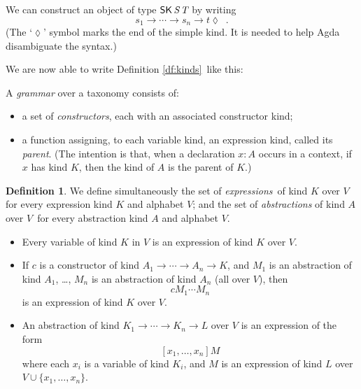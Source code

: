 \documentclass{article}
\theoremstyle{definition}
\newtheorem{df}[lm]{Definition}
\begin{document}

We can construct an object of type $\AgdaDatatype{SK} \, \AgdaBound{S} \, \AgdaBound{T}$ by writing 
$$ s_1 \longrightarrow \cdots \longrightarrow s_n \longrightarrow t \lozenge \enspace . $$
(The `$\lozenge$' symbol marks
the end of the simple kind.  It is needed to help Agda disambiguate the syntax.)

We are now able to write Definition \ref{df:kinds} like this:


A \emph{grammar} over a taxonomy consists of:
\begin{itemize}
\item
a set of \emph{constructors}, each with an associated constructor kind;
\item
a function assigning, to each variable kind, an expression kind, called its \emph{parent}.  (The intention is that, when a declaration $x : A$ occurs in a context, if $x$ has kind $K$, then the kind of $A$ is the parent of $K$.)
\end{itemize}


\begin{df}
 We define simultaneously the set of \emph{expressions} of kind $K$ over $V$for every expression kind $K$ and
alphabet $V$;
and the set of \emph{abstractions} of kind $A$ over $V$ for every abstraction kind $A$ and alphabet
$V$.
\begin{itemize}
\item Every variable of kind $K$ in $V$ is an expression of kind $K$ over $V$.
\item If $c$ is a constructor of kind $A_1 \rightarrow \cdots \rightarrow A_n \rightarrow K$,
and $M_1$ is an abstraction of kind $A_1$, \ldots, $M_n$ is an abstraction of kind $A_n$ (all over $V$), then
$$ c M_1 \cdots M_n $$
is an expression of kind $K$ over $V$.
\item
An abstraction of kind $K_1 \rightarrow \cdots \rightarrow K_n \rightarrow L$ over $V$ is
an expression of the form
\[ [x_1, \ldots, x_n] M \]
where each $x_i$ is a variable of kind $K_i$, and $M$ is an expression of kind $L$ over
$V \cup \{ x_1, \ldots, x_n \}$.
\end{itemize}
\end{df}
\end{document}
